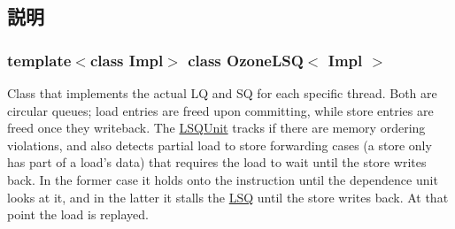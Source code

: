 \subsection{説明}
\subsubsection*{template$<$class Impl$>$ class OzoneLSQ$<$ Impl $>$}

Class that implements the actual LQ and SQ for each specific thread. Both are circular queues; load entries are freed upon committing, while store entries are freed once they writeback. The \hyperlink{classLSQUnit}{LSQUnit} tracks if there are memory ordering violations, and also detects partial load to store forwarding cases (a store only has part of a load's data) that requires the load to wait until the store writes back. In the former case it holds onto the instruction until the dependence unit looks at it, and in the latter it stalls the \hyperlink{classLSQ}{LSQ} until the store writes back. At that point the load is replayed. 

